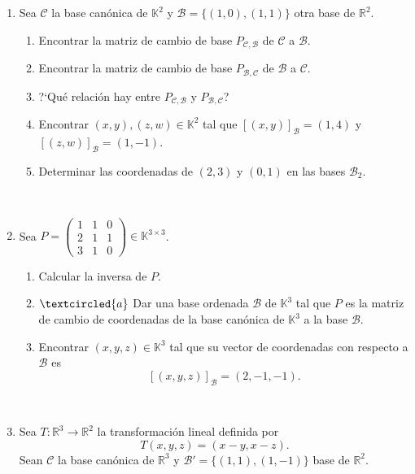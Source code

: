 \documentclass[12pt]{amsart}
\begin{document}
\begin{enumerate}
\item\label{otras bases} Sea $\mathcal{C}$ la base can\'onica de $\mathbb{K}^2$ y 
	$\mathcal{B}=\{(1,0),(1,1)\}$ otra base de $\mathbb{R}^2$.
	\begin{enumerate}
		\item Encontrar la matriz de cambio de base $P_{\mathcal{C},\mathcal{B}}$ de $\mathcal{C}$ a $\mathcal{B}$.
		\item Encontrar la matriz de cambio de base $P_{\mathcal{B},\mathcal{C}}$ de $\mathcal{B}$ a $\mathcal{C}$.
		\item ?`Qu\'e relaci\'on hay entre $P_{\mathcal{C},\mathcal{B}}$ y $P_{\mathcal{B},\mathcal{C}}$?
		\item Encontrar $(x,y),(z,w)\in\mathbb{K}^2$ tal que $[(x,y)]_{\mathcal{B}}=(1,4)$ y $[(z,w)]_{\mathcal{B}}=(1,-1)$.
		\item Determinar las coordenadas de $(2,3)$ y $(0,1)$ en las bases $\mathcal{B}_2$.
	\end{enumerate}
	
	\

	\item Sea $P=\left(\begin{array}{ccc}
      1&1&0\\2&1&1\\3&1&0
      \end{array}
\right)\in\mathbb{K}^{3\times 3}
$.

\begin{enumerate}
\item Calcular la inversa de $P$.
\item\label{base de P} $\textcircled{a}$ Dar una base ordenada $\mathcal{B}$ de $\mathbb{K}^3$  
tal que $P$ es la matriz de cambio de coordenadas de la base can\'onica de $\mathbb{K}^3$ a la
base $\mathcal{B}$.

\item Encontrar $(x,y,z)\in\mathbb{K}^3$ tal que su vector de coordenadas con respecto a $\mathcal{B}$ es 
$$[(x,y,z)]_{\mathcal{B}}=(2,-1,-1).$$
\end{enumerate}

\

\item\label{matriz transformaciones ejemplo} Sea 
$T:\mathbb{R}^3\longrightarrow\mathbb{R}^2$ la transformaci\'on lineal definida por $$T(x,y,z)=(x-y,x-z).$$ Sean $\mathcal{C}$ la base can\'onica de $\mathbb{R}^3$ y $\mathcal{B}'=\{(1,1),(1,-1)\}$ base de $\mathbb{R}^2$.


\end{enumerate}
\end{document}
